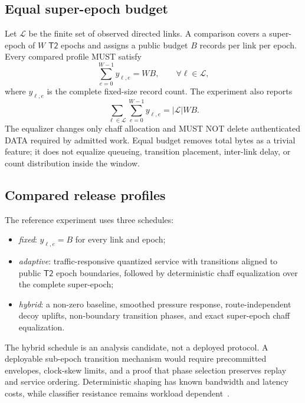 \documentclass[11pt,oneside]{article}
\newcommand{\Ttwo}{\ensuremath{\mathsf{T2}}}
\begin{document}
\subsection{Equal super-epoch budget}

Let $\mathcal{L}$ be the finite set of observed directed links. A comparison covers a super-epoch of $W$ \Ttwo{} epochs and assigns a public budget $B$ records per link per epoch. Every compared profile MUST satisfy
\begin{equation}
\sum_{e=0}^{W-1} y_{\ell,e}=WB,
\qquad \forall \ell\in\mathcal{L},
\label{eq:t3budget}
\end{equation}
where $y_{\ell,e}$ is the complete fixed-size record count. The experiment also reports
\begin{equation}
\sum_{\ell\in\mathcal{L}}\sum_{e=0}^{W-1} y_{\ell,e}=|\mathcal{L}|WB.
\label{eq:t3totalbudget}
\end{equation}
The equalizer changes only chaff allocation and MUST NOT delete authenticated DATA required by admitted work. Equal budget removes total bytes as a trivial feature; it does not equalize queueing, transition placement, inter-link delay, or count distribution inside the window.

\subsection{Compared release profiles}

The reference experiment uses three schedules:
\begin{itemize}
  \item \emph{fixed}: $y_{\ell,e}=B$ for every link and epoch;
  \item \emph{adaptive}: traffic-responsive quantized service with transitions aligned to public \Ttwo{} epoch boundaries, followed by deterministic chaff equalization over the complete super-epoch;
  \item \emph{hybrid}: a non-zero baseline, smoothed pressure response, route-independent decoy uplifts, non-boundary transition phases, and exact super-epoch chaff equalization.
\end{itemize}
The hybrid schedule is an analysis candidate, not a deployed protocol. A deployable sub-epoch transition mechanism would require precommitted envelopes, clock-skew limits, and a proof that phase selection preserves replay and service ordering. Deterministic shaping has known bandwidth and latency costs, while classifier resistance remains workload dependent~\cite{wang2014wf,wtfpad}.
\end{document}
